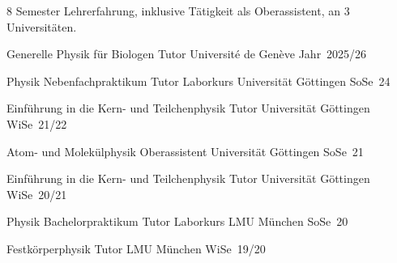 
8 Semester Lehrerfahrung, inklusive T\"atigkeit als Oberassistent, an 3 Universit\"aten.

\begin{cvhonorsleft}[4.5cm]
  \cvhonor
    {Generelle Physik f\"ur Biologen} %
    {Tutor} %
    {Universit\'e de Gen\`eve} %
    {Jahr~2025/26} %
    {}

  \cvhonor
    {Physik Nebenfachpraktikum} %
    {Tutor Laborkurs} %
    {Universit\"at G\"ottingen} %
    {SoSe~24} %
    {}

  \cvhonor
    {Einf\"uhrung in die Kern- und Teilchenphysik} %
    {Tutor} %
    {Universit\"at G\"ottingen} %
    {WiSe~21/22} %
    {}

  \cvhonor
    {Atom- und Molek\"ulphysik} %
    {%
      Oberassistent%
    } %
    {Universit\"at G\"ottingen} %
    {SoSe~21} %
    {}

  \cvhonor
    {Einf\"uhrung in die Kern- und Teilchenphysik} %
    {Tutor} %
    {Universit\"at G\"ottingen} %
    {WiSe~20/21} %
    {}

  \cvhonor
    {Physik Bachelorpraktikum} %
    {Tutor Laborkurs} %
    {LMU M\"unchen} %
    {SoSe~20} %
    {}

  \cvhonor
    {Festk\"orperphysik} %
    {Tutor} %
    {LMU M\"unchen} %
    {WiSe~19/20} %
    {}

\end{cvhonorsleft}
